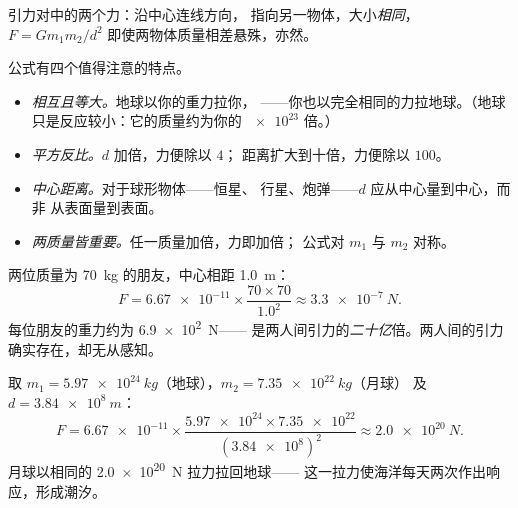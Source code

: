 \begin{omfigure}

{\small 引力对中的两个力：沿中心连线方向，
指向另一物体，大小\emph{相同}，
$F = G m_1 m_2 / d^2$ 即使两物体质量相差悬殊，亦然。}
\end{omfigure}

\begin{remark}[读懂公式]\label{rem:g10:universal-gravitation:reading}
公式有四个值得注意的特点。
\begin{itemize}
  \item \emph{相互且等大。}地球以你的重力拉你，
        ——你也以完全相同的力拉地球。（地球
        只是反应较小：它的质量约为你的
        $\num{e23}$ 倍。）
  \item \emph{平方反比。}$d$ 加倍，力便除以 $4$；
        距离扩大到十倍，力便除以 $100$。
  \item \emph{中心距离。}对于球形物体——恒星、
        行星、炮弹——$d$ 应从中心量到中心，而非
        从表面量到表面。
  \item \emph{两质量皆重要。}任一质量加倍，力即加倍；
        公式对 $m_1$ 与 $m_2$ 对称。
\end{itemize}
\end{remark}

\begin{example}[两个朋友]\label{ex:g10:universal-gravitation:friends}
两位质量为 \qty{70}{kg} 的朋友，中心相距 \qty{1.0}{m}：
\[
F = \num{6.67e-11} \times \frac{70 \times 70}{1.0^2}
\approx \qty{3.3e-7}{N}.
\]
每位朋友的重力约为 \qty{6.9e2}{N}——
是两人间引力的\emph{二十亿}倍。两人间的引力确实存在，却无从感知。
\end{example}

\begin{example}[地球束缚月球]\label{ex:g10:universal-gravitation:earthmoon}
取 $m_1 = \qty{5.97e24}{kg}$（地球），$m_2 = \qty{7.35e22}{kg}$（月球）
及 $d = \qty{3.84e8}{m}$：
\[
F = \num{6.67e-11} \times
\frac{\num{5.97e24} \times \num{7.35e22}}{(\num{3.84e8})^2}
\approx \qty{2.0e20}{N}.
\]
月球以相同的 \qty{2.0e20}{N} 拉力拉回地球——
这一拉力使海洋每天两次作出响应，形成潮汐。
\end{example}


